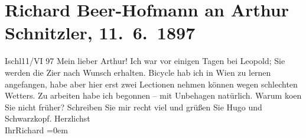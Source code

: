 

         
         \renewcommand{\erwaehntePersonen}{Personen: Richard Beer-Hofmann, Hugo von Hofmannsthal, Leopold Petter, Gustav Schwarzkopf}
         \renewcommand{\erwaehnteOrte}{Orte: Bad Ischl, Wien}
         \renewcommand{\erwaehnteWerke}{}
               \section[Richard Beer-Hofmann an Arthur Schnitzler, 11. 6. 1897]{ Richard Beer-Hofmann an Arthur Schnitzler, 11. 6. 1897}\nopagebreak{}\rehead{ }\begin{ledgroupsized}[t]{13cm}\normalsize\beginnumbering{} \toendnotes[C]{\smallbreak\pagebreak[2]} 
\pstart
           \raggedleft{}{\pb}Ischl11/VI 97\pend
           \pstart
           Mein lieber Arthur!\pend
           \pstart
           Ich war vor einigen Tagen bei Leopold; Sie
               werden die Zi{\geminationm}er nach Wunsch erhalten. Bicycle hab ich
               in Wien zu lernen angefangen, habe aber hier erst
               zwei Lectionen nehmen können wegen schlechten Wetters.\pend
           \pstart
           {\pb}Zu arbeiten habe ich begonnen –
               mit Unbehagen natürlich.\pend
           \pstart
           Warum ko{\geminationm}en Sie nicht früher? Schreiben Sie mir recht
               viel und grüßen Sie Hugo und Schwarzkopf.\pend
           \pstart
           Herzlichst{\\[\baselineskip]}Ihr\spacefill\mbox{Richard}\pend
           \leftskip=0em{}
         
         \endnumbering{}\end{ledgroupsized}  \newcommand{\dateiname}{L00684}\newcommand{\titel}{Richard Beer-Hofmann an Arthur Schnitzler, 11. 6. 1897}\newcommand{\editorInnen}{Martin Anton Müller und Gerd-Hermann Susen}
      